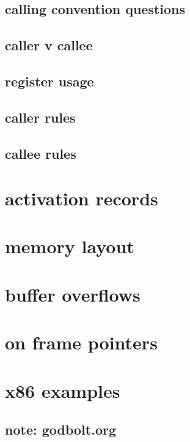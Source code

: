 \subsection{calling convention questions}

\subsection{caller v callee}

\subsection{register usage}

\subsection{caller rules}
    




\subsection{callee rules}


\section{activation records}

\section{memory layout}

\section{buffer overflows}

\section{on frame pointers}

\section{x86 examples}

\subsection{note: godbolt.org}

